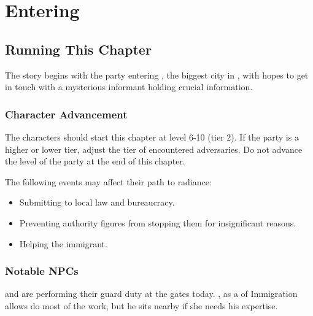 \chapter{Entering \locationYeddaw{}}
\label{chap:chapter1}

\setcounter{section}{-1}
\section{Running This Chapter}

The story begins with the party entering \locationYeddaw{}, the biggest city in \locationTashikk{}, with hopes to get in touch with a mysterious informant holding crucial information.

\subsection{Character Advancement}

The characters should start this chapter at level 6-10 (tier 2). If the party is a higher or lower tier, adjust the tier of encountered adversaries. Do not advance the level of the party at the end of this chapter.

The following events may affect their path to radiance:
\begin{itemize}
	\item Submitting to local law and bureaucracy.
	\item Preventing authority figures from stopping them for insignificant reasons.
	\item Helping the immigrant.
\end{itemize}

\subsection{Notable NPCs}

\npcHauka{} and \npcNissiqqan{} are performing their guard duty at the gates today. \npcNissiqqan{}, as a \enemyScribeNameB{} of Immigration allows \npcHauka{} do most of the work, but he sits nearby if she needs his expertise.













